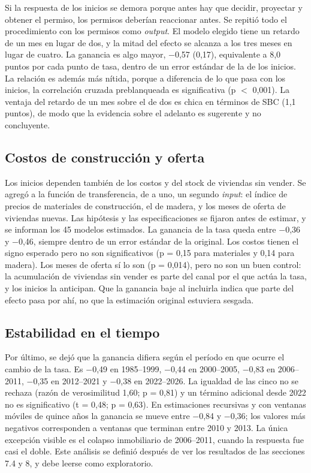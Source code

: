 \documentclass[11pt,a4paper]{article}
\begin{document}
Si la respuesta de los inicios se demora porque antes hay que decidir, proyectar y obtener el permiso, los permisos deberían reaccionar antes. Se repitió todo el procedimiento con los permisos como \emph{output}. El modelo elegido tiene un retardo de un mes en lugar de dos, y la mitad del efecto se alcanza a los tres meses en lugar de cuatro. La ganancia es algo mayor, $-$0,57 (0,17), equivalente a 8,0 puntos por cada punto de tasa, dentro de un error estándar de la de los inicios. La relación es además más nítida, porque a diferencia de lo que pasa con los inicios, la correlación cruzada preblanqueada es significativa (p $<$ 0,001). La ventaja del retardo de un mes sobre el de dos es chica en términos de SBC (1,1 puntos), de modo que la evidencia sobre el adelanto es sugerente y no concluyente.

\subsection{Costos de construcción y oferta}

Los inicios dependen también de los costos y del stock de viviendas sin vender. Se agregó a la función de transferencia, de a uno, un segundo \emph{input}: el índice de precios de materiales de construcción, el de madera, y los meses de oferta de viviendas nuevas. Las hipótesis y las especificaciones se fijaron antes de estimar, y se informan los 45 modelos estimados. La ganancia de la tasa queda entre $-$0,36 y $-$0,46, siempre dentro de un error estándar de la original. Los costos tienen el signo esperado pero no son significativos (p = 0,15 para materiales y 0,14 para madera). Los meses de oferta sí lo son (p = 0,014), pero no son un buen control: la acumulación de viviendas sin vender es parte del canal por el que actúa la tasa, y los inicios la anticipan. Que la ganancia baje al incluirla indica que parte del efecto pasa por ahí, no que la estimación original estuviera sesgada.

\subsection{Estabilidad en el tiempo}

Por último, se dejó que la ganancia difiera según el período en que ocurre el cambio de la tasa. Es $-$0,49 en 1985--1999, $-$0,44 en 2000--2005, $-$0,83 en 2006--2011, $-$0,35 en 2012--2021 y $-$0,38 en 2022--2026. La igualdad de las cinco no se rechaza (razón de verosimilitud 1,60; p = 0,81) y un término adicional desde 2022 no es significativo (t = 0,48; p = 0,63). En estimaciones recursivas y con ventanas móviles de quince años la ganancia se mueve entre $-$0,84 y $-$0,36; los valores más negativos corresponden a ventanas que terminan entre 2010 y 2013. La única excepción visible es el colapso inmobiliario de 2006--2011, cuando la respuesta fue casi el doble. Este análisis se definió después de ver los resultados de las secciones 7.4 y 8, y debe leerse como exploratorio.
\end{document}
